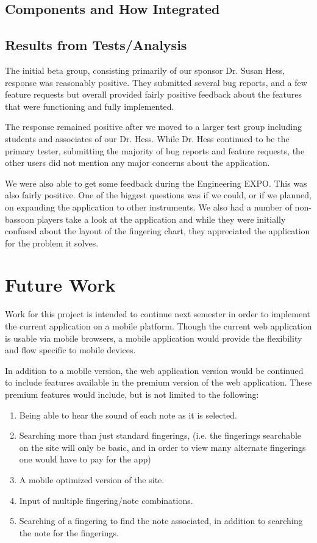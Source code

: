 \documentclass[12pt,english]{article}
\begin{document}
\subsection{Components and How Integrated}


\subsection{Results from Tests/Analysis}
The initial beta group, consisting primarily of our sponsor Dr. Susan Hess,
response was reasonably positive.  They submitted several bug reports, 
and a few feature requests but overall provided fairly positive feedback 
about the features that were functioning and fully implemented.

The response remained positive after we moved to a larger test group
including students and associates of our Dr. Hess.  While Dr. Hess continued
to be the primary tester, submitting the majority of bug reports and feature
requests, the other users did not mention any major concerns about the application.

We were also able to get some feedback during the Engineering EXPO.  This
was also fairly positive.  One of the biggest questions was if we could, or
if we planned, on expanding the application to other instruments.  We also
had a number of non-bassoon players take a look at the application and while
they were initially confused about the layout of the fingering chart, they
appreciated the application for the problem it solves.

\section{Future Work}
Work for this project is intended to continue next semester in order
to implement the current application on a mobile platform. Though
the current web application is usable via mobile browsers, a mobile
application would provide the flexibility and flow specific to mobile
devices.

In addition to a mobile version, the web application version would
be continued to include features available in the premium version
of the web application. These premium features would include, but
is not limited to the following:

\begin{enumerate}
	\item Being able to hear the sound of each note as it is selected. 
	\item Searching more than just standard fingerings, (i.e. the fingerings
		searchable on the site will only be basic, and in order to view many
		alternate fingerings one would have to pay for the app) 
	\item A mobile optimized version of the site. 
	\item Input of multiple fingering/note combinations. 
	\item Searching of a fingering to find the note associated, in addition
		to searching the note for the fingerings. 
\end{enumerate}
\end{document}
